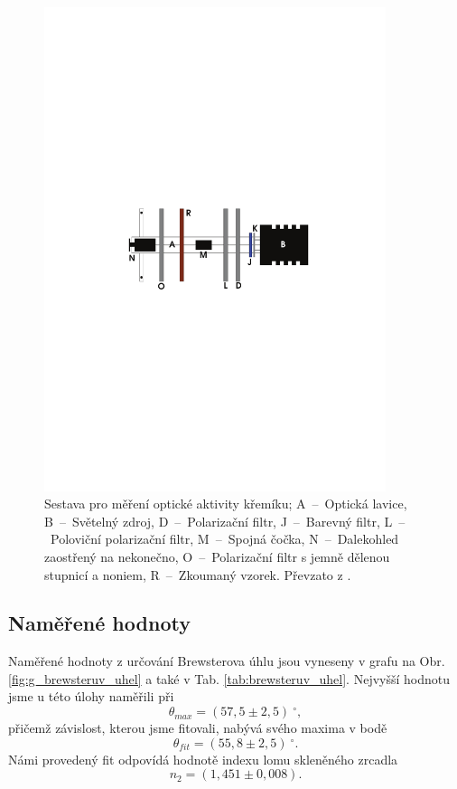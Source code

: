 \documentclass[english]{article}
\begin{document}
			\begin{figure}[h!]
			\centering
			\includegraphics[width=10cm]{att/opticka_aktivita.pdf}
			\caption{Sestava pro měření optické aktivity křemíku; A~--~Optická lavice, B~--~Světelný zdroj, D~--~Polarizační filtr, J~--~Barevný filtr, L~--~Poloviční polarizační filtr, M~--~Spojná čočka, N~--~Dalekohled zaostřený na nekonečno, O~--~Polarizační filtr s jemně dělenou stupnicí a noniem, R~--~Zkoumaný vzorek. Převzato z \cite{bib:zadani}.}
			\label{fig:opticka_aktivita}
			\end{figure}

	\subsection{Naměřené hodnoty}
		Naměřené hodnoty z určování Brewsterova úhlu jsou vyneseny v grafu na Obr. \ref{fig:g_brewsteruv_uhel} a také v Tab. \ref{tab:brewsteruv_uhel}. Nejvyšší hodnotu jsme u této úlohy naměřili při 
		\begin{equation}
			\theta_{max} = (57,5 \pm 2,5)~^\circ,
		\end{equation}
		přičemž závislost, kterou jsme fitovali, nabývá svého maxima v bodě
		\begin{equation}
			\theta_{fit} = (55,8 \pm 2,5)~^\circ.
		\end{equation}
		Námi provedený fit odpovídá hodnotě indexu lomu skleněného zrcadla 
		\begin{equation}
			n_2 = (1,451 \pm 0,008).
		\end{equation}
		
\end{document}
